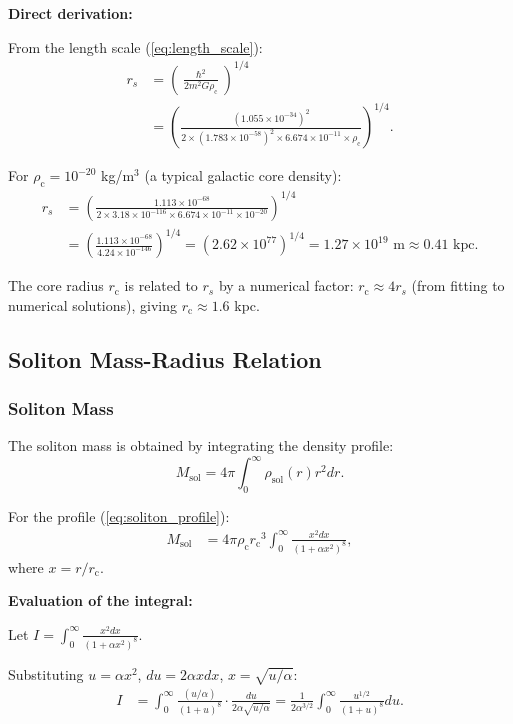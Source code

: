 \documentclass[11pt,a4paper]{article}
\newcommand{\ee}[1]{\times 10^{#1}}
\newcommand{\hbar}{\ensuremath{\hslash}}
\newcommand{\Msol}{\ensuremath{M_{\mathrm{sol}}}}
\newcommand{\rc}{\ensuremath{r_{\mathrm{c}}}}
\newcommand{\rhoc}{\ensuremath{\rho_{\mathrm{c}}}}
\theoremstyle{definition}
\theoremstyle{remark}
\begin{document}
\textbf{Direct derivation:}

From the length scale (\ref{eq:length_scale}):
\begin{align}
r_s &= \left(\frac{\hbar^2}{2m^2 G \rhoc}\right)^{1/4} \\
&= \left(\frac{(1.055 \ee{-34})^2}{2 \times (1.783 \ee{-58})^2 \times 6.674 \ee{-11} \times \rhoc}\right)^{1/4}.
\end{align}

For $\rhoc = 10^{-20}$ kg/m$^3$ (a typical galactic core density):
\begin{align}
r_s &= \left(\frac{1.113 \ee{-68}}{2 \times 3.18 \ee{-116} \times 6.674 \ee{-11} \times 10^{-20}}\right)^{1/4} \nonumber \\
&= \left(\frac{1.113 \ee{-68}}{4.24 \ee{-146}}\right)^{1/4} = (2.62 \ee{77})^{1/4} = 1.27 \ee{19} \text{ m} \approx 0.41 \text{ kpc}.
\end{align}

The core radius $\rc$ is related to $r_s$ by a numerical factor: $\rc \approx 4 r_s$ (from fitting to numerical solutions), giving $\rc \approx 1.6$ kpc.

\subsection{Soliton Mass-Radius Relation}
\label{sec:mass_radius}

\subsubsection{Soliton Mass}

The soliton mass is obtained by integrating the density profile:
\begin{equation}
\Msol = 4\pi \int_0^\infty \rho_{\mathrm{sol}}(r) r^2 dr.
\end{equation}

For the profile (\ref{eq:soliton_profile}):
\begin{align}
\Msol &= 4\pi \rhoc \rc^3 \int_0^\infty \frac{x^2 dx}{(1 + \alpha x^2)^8},
\end{align}
where $x = r/\rc$.

\textbf{Evaluation of the integral:}

Let $I = \int_0^\infty \frac{x^2 dx}{(1 + \alpha x^2)^8}$.

Substituting $u = \alpha x^2$, $du = 2\alpha x dx$, $x = \sqrt{u/\alpha}$:
\begin{align}
I &= \int_0^\infty \frac{(u/\alpha)}{(1+u)^8} \cdot \frac{du}{2\alpha\sqrt{u/\alpha}} = \frac{1}{2\alpha^{3/2}} \int_0^\infty \frac{u^{1/2}}{(1+u)^8} du.
\end{align}
\end{document}
